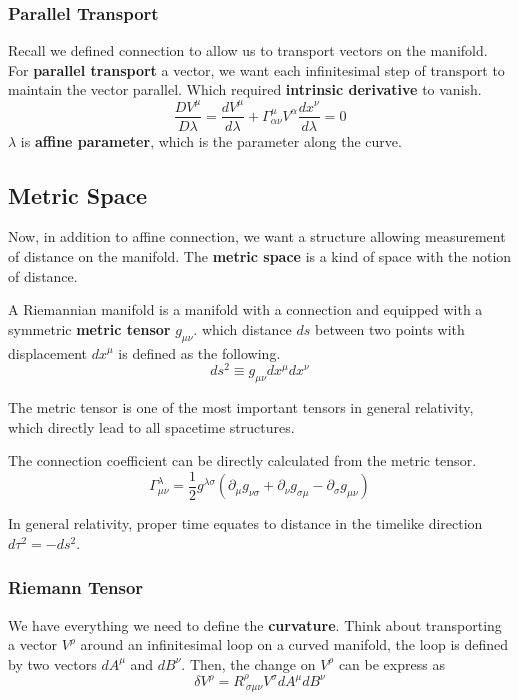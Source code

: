\documentclass[12pt]{article}
\theoremstyle{mystyle}{\newtheorem{definition}{Definition}[subsection]}
\theoremstyle{mystyle}{\newtheorem{theorem}[definition]{Theorem}}
\theoremstyle{mystyle}{\newtheorem*{remark}{Remark}}
\theoremstyle{mystyle}{\newtheorem{example}{Example}[subsection]}
\theoremstyle{mystyle}{\newtheorem{examples}{Examples}[subsection]}
\theoremstyle{mystyle}{\newtheorem{cthm}{}[subsection]}
\begin{document}
\subsubsection{Parallel Transport}
Recall we defined connection to allow us to transport vectors on the manifold.
For \textbf{parallel transport} a vector, we want each infinitesimal step of transport to maintain the vector parallel.
Which required \textbf{intrinsic derivative} to vanish.\[\frac{DV^{\mu}}{D\lambda} =
  \frac{dV^{\mu}}{d\lambda}+ \Gamma^{\mu}_{\alpha\nu}V^{\alpha}\frac{dx^{\nu}}{d\lambda} = 0\]
\(\lambda\) is \textbf{affine parameter}, which is the parameter along the curve.

\subsection{Metric Space}
Now, in addition to affine connection, we want a structure allowing measurement of distance on the manifold.
The \textbf{metric space} is a kind of space with the notion of distance.
\begin{definition}
  A Riemannian manifold is a manifold with a connection and equipped with a symmetric \textbf{metric tensor} \(g_{\mu\nu}\).
  which distance \(ds\) between two points with displacement \(dx^{\mu}\) is defined as the following.
  \[ds^2 \equiv g_{\mu \nu} dx^{\mu} dx^{\nu}\]
\end{definition}
The metric tensor is one of the most important tensors in general relativity,
which directly lead to all spacetime structures.
\begin{example}
  The connection coefficient can be directly calculated from the metric tensor.
  \[\Gamma_{\mu\nu}^{\lambda} = \frac{1}{2}g^{\lambda\sigma}(\partial_{\mu}g_{\nu\sigma}+ \partial_{\nu}g_{\sigma\mu}
    - \partial_{\sigma}g_{\mu\nu})\]
\end{example}
In general relativity, proper time equates to distance in the timelike direction \(d\tau^2 = - ds^2\).

\subsubsection{Riemann Tensor}
We have everything we need to define the \textbf{curvature}. Think about transporting a vector \(V^\rho\)
around an infinitesimal loop on a curved manifold, the loop is defined by two vectors \(dA^\mu\) and \(dB^\nu\).
Then, the change on \(V^\rho\) can be express as \[\delta V^\rho = R^{\rho}_{\ \sigma\mu\nu}V^{\sigma}dA^{\mu}dB^{\nu}\]
\end{document}
